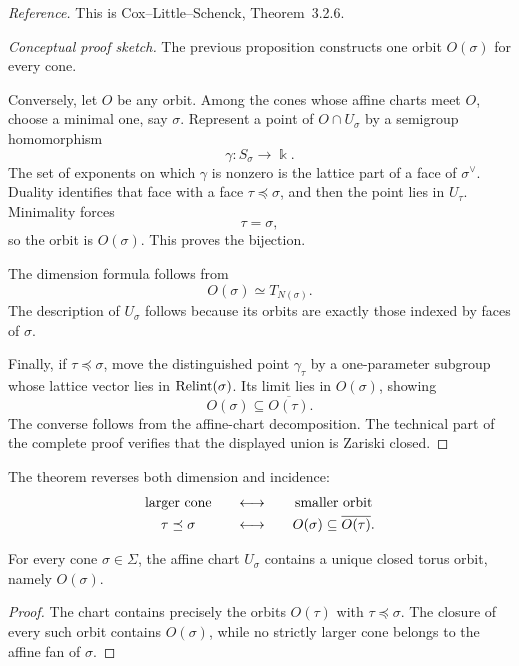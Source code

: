 \noindent
\textit{Reference.}
This is Cox--Little--Schenck, Theorem~3.2.6.

\begin{proof}[Conceptual proof sketch]
The previous proposition constructs one orbit \(O(\sigma)\) for every
cone.

Conversely, let \(O\) be any orbit. Among the cones whose affine
charts meet \(O\), choose a minimal one, say \(\sigma\). Represent a
point of \(O\cap U_\sigma\) by a semigroup homomorphism
\[
\gamma:S_\sigma\to\Bbbk.
\]
The set of exponents on which \(\gamma\) is nonzero is the lattice
part of a face of \(\sigma^\vee\). Duality identifies that face with
a face \(\tau\preceq\sigma\), and then the point lies in \(U_\tau\).
Minimality forces
\[
\tau=\sigma,
\]
so the orbit is \(O(\sigma)\). This proves the bijection.

The dimension formula follows from
\[
O(\sigma)\simeq T_{N(\sigma)}.
\]
The description of \(U_\sigma\) follows because its orbits are exactly
those indexed by faces of \(\sigma\).

Finally, if \(\tau\preceq\sigma\), move the distinguished point
\(\gamma_\tau\) by a one-parameter subgroup whose lattice vector lies
in \(\operatorname{Relint}(\sigma)\). Its limit lies in
\(O(\sigma)\), showing
\[
O(\sigma)\subseteq\overline{O(\tau)}.
\]
The converse follows from the affine-chart decomposition. The
technical part of the complete proof verifies that the displayed
union is Zariski closed.
\end{proof}

The theorem reverses both dimension and incidence:
\[
\begin{array}{c@{\qquad\longleftrightarrow\qquad}c}
\text{larger cone}
&
\text{smaller orbit}
\\[1mm]
\tau\preceq\sigma
&
O(\sigma)\subseteq\overline{O(\tau)}.
\end{array}
\]

\begin{corollary}
\label{cor:closed-orbit-affine-chart}
For every cone \(\sigma\in\Sigma\), the affine chart \(U_\sigma\)
contains a unique closed torus orbit, namely \(O(\sigma)\).
\end{corollary}

\begin{proof}
The chart contains precisely the orbits \(O(\tau)\) with
\(\tau\preceq\sigma\). The closure of every such orbit contains
\(O(\sigma)\), while no strictly larger cone belongs to the affine fan
of \(\sigma\).
\end{proof}


